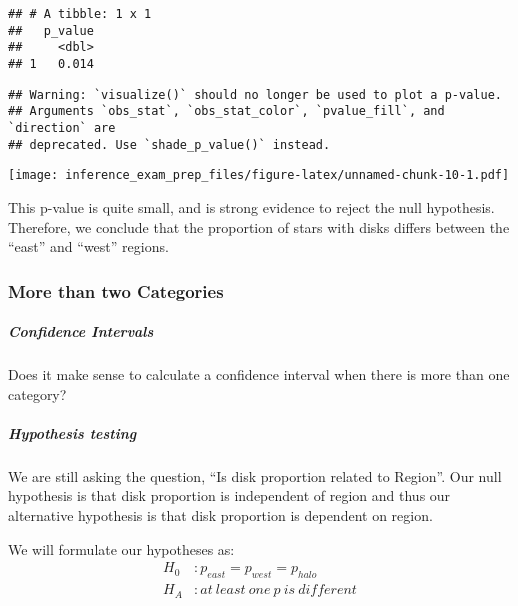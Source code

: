 \documentclass[]{article}
\newenvironment{Shaded}{\begin{snugshade}}{\end{snugshade}}
\newcommand{\DataTypeTok}[1]{\textcolor[rgb]{0.13,0.29,0.53}{#1}}
\newcommand{\KeywordTok}[1]{\textcolor[rgb]{0.13,0.29,0.53}{\textbf{#1}}}
\newcommand{\NormalTok}[1]{#1}
\newcommand{\OperatorTok}[1]{\textcolor[rgb]{0.81,0.36,0.00}{\textbf{#1}}}
\newcommand{\StringTok}[1]{\textcolor[rgb]{0.31,0.60,0.02}{#1}}
\let\oldsubparagraph\subparagraph
\renewcommand{\subparagraph}[1]{\oldsubparagraph{#1}\mbox{}}
\begin{document}
\begin{verbatim}
## # A tibble: 1 x 1
##   p_value
##     <dbl>
## 1   0.014
\end{verbatim}

\begin{Shaded}
\end{Shaded}

\begin{verbatim}
## Warning: `visualize()` should no longer be used to plot a p-value.
## Arguments `obs_stat`, `obs_stat_color`, `pvalue_fill`, and `direction` are
## deprecated. Use `shade_p_value()` instead.
\end{verbatim}

\texttt{[image: inference\_exam\_prep\_files/figure-latex/unnamed-chunk-10-1.pdf]}

This p-value is quite small, and is strong evidence to reject the null
hypothesis. Therefore, we conclude that the proportion of stars with
disks differs between the ``east'' and ``west'' regions.

\hypertarget{more-than-two-categories}{%
\subsubsection{More than two
Categories}\label{more-than-two-categories}}

\hypertarget{confidence-intervals-1}{%
\subparagraph{Confidence Intervals}\label{confidence-intervals-1}}

Does it make sense to calculate a confidence interval when there is more
than one category?

\hypertarget{hypothesis-testing-1}{%
\subparagraph{Hypothesis testing}\label{hypothesis-testing-1}}

We are still asking the question, ``Is disk proportion related to
Region''. Our null hypothesis is that disk proportion is independent of
region and thus our alternative hypothesis is that disk proportion is
dependent on region.

We will formulate our hypotheses as: \[
\begin{aligned}
H_{0} &: p_{east}  = p_{west} = p_{halo}  \\
H_{A} &: at~least~one~p~is~different
\end{aligned}
\]
\end{document}
